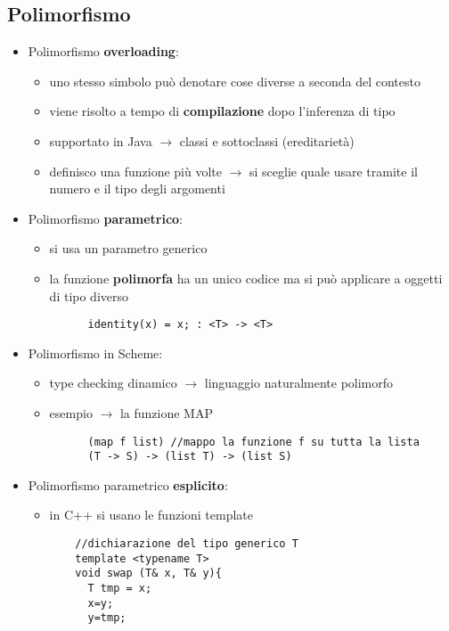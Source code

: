 \documentclass{article}
\begin{document}
\begin{flushleft}
\section*{Polimorfismo}
\begin{itemize}
  \item Polimorfismo \textbf{overloading}:
  \begin{itemize}
    \item uno stesso simbolo può denotare cose diverse a seconda del contesto
    \item viene risolto a tempo di \textbf{compilazione} dopo l'inferenza di tipo
    \item supportato in Java $\rightarrow$ classi e sottoclassi (ereditarietà)
    \item definisco una funzione più volte $\rightarrow$ si sceglie quale usare tramite il numero e il tipo degli argomenti
  \end{itemize}
  \item Polimorfismo \textbf{parametrico}:
  \begin{itemize}
    \item si usa un parametro generico 
    \item la funzione \textbf{polimorfa} ha un unico codice ma si può applicare a oggetti di tipo diverso
    \begin{lstlisting}
      identity(x) = x; : <T> -> <T>
    \end{lstlisting}
  \end{itemize}
  \item Polimorfismo in Scheme:
  \begin{itemize}
    \item type checking dinamico $\rightarrow$ linguaggio naturalmente polimorfo
    \item esempio $\rightarrow$ la funzione MAP
    \begin{lstlisting}
      (map f list) //mappo la funzione f su tutta la lista
      (T -> S) -> (list T) -> (list S)
    \end{lstlisting}
  \end{itemize}
  \newpage
  \item Polimorfismo parametrico \textbf{esplicito}:
  \begin{itemize}
    \item in C++ si usano le funzioni template
  \begin{lstlisting}
    //dichiarazione del tipo generico T
    template <typename T>
    void swap (T& x, T& y){
      T tmp = x; 
      x=y; 
      y=tmp;

\end{lstlisting}
\end{itemize}
\end{itemize}
\end{flushleft}
\end{document}
